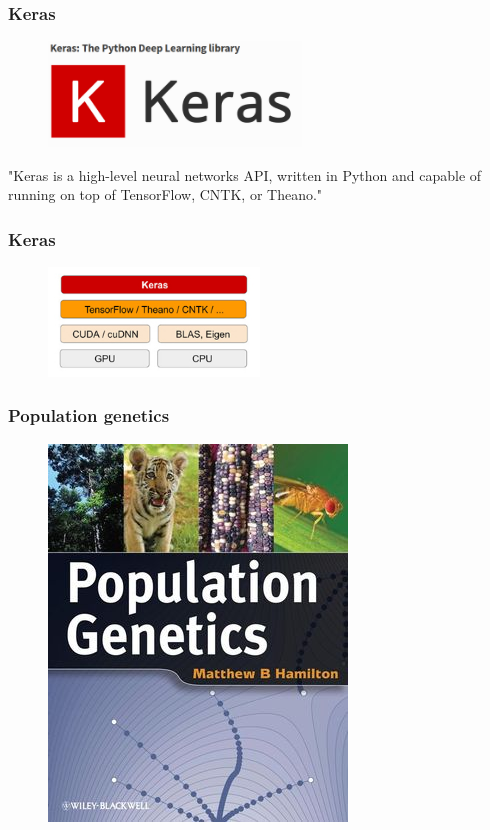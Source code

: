 \begin{frame}
        \frametitle{Keras}

         \begin{figure}
                \includegraphics[width=0.6\textwidth]{Pics/keras.png}
        \end{figure}

	"Keras is a high-level neural networks API, written in Python and capable of running on 
	top of TensorFlow, CNTK, or Theano."

\end{frame}

\begin{frame}
        \frametitle{Keras}

         \begin{figure}
                \includegraphics[width=0.5\textwidth]{Pics/keras2.jpg}
        \end{figure}

\end{frame}

\begin{frame}
        \frametitle{Population genetics}

        \begin{figure}
                        \includegraphics[height=0.6\textheight]{Pics/popgen.jpg}
        \end{figure}

\end{frame}


